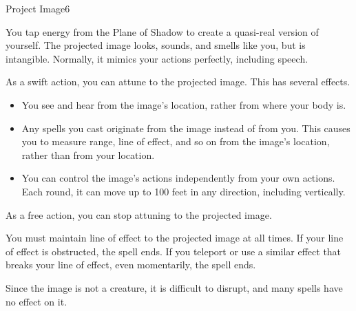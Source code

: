 \begin{spellsection}{Project Image}{6}
\begin{spellheader}
    \spellrng{\rngmed}
\end{spellheader}
\begin{spellcontent}
    \spelleffect You tap energy from the Plane of Shadow to create a quasi-real version of yourself. The projected image looks, sounds, and smells like you, but is intangible. Normally, it mimics your actions perfectly, including speech.
    \par As a swift action, you can attune to the projected image. This has several effects.
    \begin{itemize}
        \item You see and hear from the image's location, rather from where your body is.
        \item Any spells you cast originate from the image instead of from you. This causes you to measure range, line of effect, and so on from the image's location, rather than from your location.
        \item You can control the image's actions independently from your own actions. Each round, it can move up to 100 feet in any direction, including vertically.
    \end{itemize}

    As a free action, you can stop attuning to the projected image.

    \spelldur \durmed \dismissable
\end{spellcontent}
\begin{spellfooter}
    \spellnotes You must maintain line of effect to the projected image at all times. If your line of effect is obstructed, the spell ends. If you teleport or use a similar effect that breaks your line of effect, even momentarily, the spell ends.

    Since the image is not a creature, it is difficult to disrupt, and many spells have no effect on it.
\end{spellfooter}
\end{spellsection}

